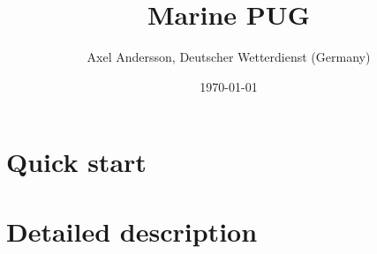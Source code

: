 \documentclass[a4paper,12pt,hidelinks,oneside]{report}
\title {Marine PUG}
\author {Axel Andersson, Deutscher Wetterdienst (Germany)}
\date{\today}
\begin{document}
\thispagestyle{empty}

\newpage
 \newpage
\renewcommand{\contentsname}{\color{maroon}{Contents}}
\newpage\tableofcontents\thispagestyle{fancy}
\newpage


\clearpage\part{Quick start}

\clearpage\part{Detailed description}

\FloatBarrier
\clearpage
\clearpage
\clearpage

\FloatBarrier
{}
\let\Origclearpage\clearpage
\let\clearpage\relax
\renewcommand\bibname{\color{maroon}References}
\clearpage
\ifodd\value{page}\hbox{}\vspace*{\fill}\thispagestyle{empty}\newpage\fi

\end{document}
